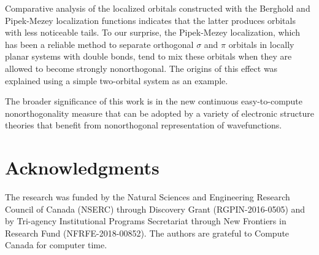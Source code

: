 \documentclass[aps,prl,reprint,amsmath,amssymb]{revtex4-1}
\begin{document}
Comparative analysis of the localized orbitals constructed with the Berghold and Pipek-Mezey localization functions indicates that the latter produces orbitals with less noticeable tails. To our surprise, the Pipek-Mezey localization, which has been a reliable method to separate orthogonal $\sigma$ and $\pi$ orbitals in locally planar systems with double bonds, tend to mix these orbitals when they are allowed to become strongly nonorthogonal. The origins of this effect was explained using a simple two-orbital system as an example.

The broader significance of this work is in the new continuous easy-to-compute nonorthogonality measure that can be adopted by a variety of electronic structure theories that benefit from nonorthogonal representation of wavefunctions. %

\section{Acknowledgments} 

The research was funded by the Natural Sciences and Engineering Research Council of Canada (NSERC) through Discovery
Grant (RGPIN-2016-0505) and by Tri-agency Institutional Programs Secretariat through New Frontiers in Research Fund (NFRFE-2018-00852). The authors are grateful to Compute Canada for computer time.

%

\end{document}
